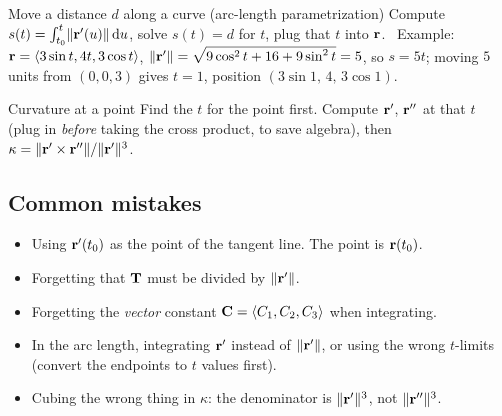 \begin{strategy}{Move a distance $d$ along a curve (arc-length parametrization)}
Compute $s(t)=\int_{t_0}^t\lVert\mathbf{r}'(u)\rVert\,\mathrm{d} u$, solve $s(t)=d$ for $t$, plug that $t$ into
$\mathbf{r}$. \ Example: $\mathbf{r}=\left\langle 3\sin t,4t,3\cos t \right\rangle$, $\lVert\mathbf{r}'\rVert=\sqrt{9\cos^2t+16+9\sin^2t}=5$, so $s=5t$;
moving $5$ units from $(0,0,3)$ gives $t=1$, position $(3\sin1,\,4,\,3\cos1)$.
\end{strategy}

\begin{strategy}{Curvature at a point}
Find the $t$ for the point first. Compute $\mathbf{r}'$, $\mathbf{r}''$ at that $t$ (plug in \emph{before}
taking the cross product, to save algebra), then $\kappa=\lVert\mathbf{r}'\times\mathbf{r}''\rVert/\lVert\mathbf{r}'\rVert^3$.
\end{strategy}

\subsection*{Common mistakes}
\begin{itemize}
\item Using $\mathbf{r}'(t_0)$ as the point of the tangent line. The point is $\mathbf{r}(t_0)$.
\item Forgetting that $\mathbf{T}$ must be divided by $\lVert\mathbf{r}'\rVert$.
\item Forgetting the \emph{vector} constant $\mathbf{C}=\left\langle C_1,C_2,C_3 \right\rangle$ when integrating.
\item In the arc length, integrating $\mathbf{r}'$ instead of $\lVert\mathbf{r}'\rVert$, or using the wrong $t$-limits
  (convert the endpoints to $t$ values first).
\item Cubing the wrong thing in $\kappa$: the denominator is $\lVert\mathbf{r}'\rVert^{3}$, not $\lVert\mathbf{r}''\rVert^3$.
\end{itemize}
